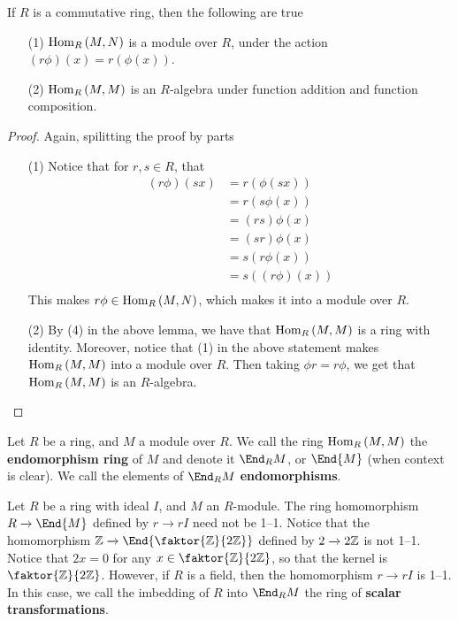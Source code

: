 \begin{corollary}
    If $R$ is a commutative ring, then the following are true
    \begin{enumerate}
        \item[(1)] $\operatorname{Hom}_R{(M,N)}$ is a module over $R$, under the action
            $(r\phi)(x)=r(\phi(x))$.

        \item[(2)] $\operatorname{Hom}_R{(M,M)}$ is an $R$-algebra under function addition and
            function composition.
    \end{enumerate}
\end{corollary}
\begin{proof}
    Again, spilitting the proof by parts
    \begin{enumerate}
        \item[(1)] Notice that for $r,s \in R$, that
            \begin{align*}
                (r\phi)(sx) &=  r(\phi(sx)) \\
                         &= r(s\phi(x)) \\
                         &= (rs)\phi(x) \\
                         &= (sr)\phi(x) \\
                         &= s(r\phi(x)) \\
                         &= s((r\phi)(x))   \\
            \end{align*}
            This makes $r\phi \in \operatorname{Hom}_R{(M,N)}$, which makes it into a module
            over $R$.

        \item[(2)] By (4) in the above lemma, we have that $\operatorname{Hom}_R{(M,M)}$ is a
            ring with identity. Moreover, notice that (1) in the above statement
            makes $\operatorname{Hom}_R{(M,M)}$ into a module over $R$. Then taking
            $\phi{r}=r\phi$, we get that $\operatorname{Hom}_R{(M,M)}$ is an $R$-algebra.
    \end{enumerate}
\end{proof}

\begin{definition}
    Let $R$ be a ring, and  $M$ a module over  $R$. We call the ring
    $\operatorname{Hom}_R{(M,M)}$ the \textbf{endomorphism ring} of $M$ and denote it
    $\End_R{M}$, or $\End{M}$ (when context is clear). We call the elements of
    $\End_R{M}$ \textbf{endomorphisms}.
\end{definition}

\begin{example}\label{example_4.5}
    Let $R$ be a ring with ideal $I$, and  $M$ an  $R$-module. The ring
    homomorphism $R \xrightarrow{} \End{M}$ defined by $r \xrightarrow{} rI$
    need not be 1--1. Notice that the homomorphism $\Z \xrightarrow{}
    \End{\faktor{\Z}{2\Z}}$ defined by $2 \xrightarrow{} 2\mathbb{Z}$ is not 1--1.
    Notice that $2x=0$ for any $x \in \faktor{\Z}{2\Z}$, so that the kernel is
    $\faktor{\Z}{2\Z}$. However, if $R$ is a field, then the homomorphism  $r
    \xrightarrow{} rI$ is 1--1. In this case, we call the imbedding of $R$ into
     $\End_R{M}$ the ring of \textbf{scalar transformations}.
\end{example}

